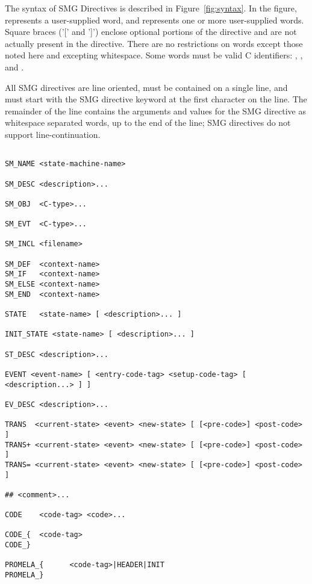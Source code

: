 The syntax of SMG Directives is described in Figure~\ref{fig:syntax}.
In the figure,  represents a user-supplied word, and
  represents one or more user-supplied words.  Square
braces ('[' and ']') enclose optional portions of the directive and
are not actually present in the directive.  There are no restrictions
on  words except those noted here and excepting whitespace.
Some  words must be valid C identifiers:
, , and
.

All SMG directives are line oriented, must be contained on a single
line, and must start with the SMG directive keyword at the first
character on the line.  The remainder of the line contains the
arguments and values for the SMG directive as whitespace separated
words, up to the end of the line; SMG directives do not support
line-continuation.

\begin{figure*}[p]
\begin{verbatim}

SM_NAME <state-machine-name>

SM_DESC <description>...

SM_OBJ  <C-type>...

SM_EVT  <C-type>...

SM_INCL <filename>

SM_DEF  <context-name>
SM_IF   <context-name>
SM_ELSE <context-name>
SM_END  <context-name>

STATE   <state-name> [ <description>... ]

INIT_STATE <state-name> [ <description>... ]

ST_DESC <description>...

EVENT <event-name> [ <entry-code-tag> <setup-code-tag> [ <description...> ] ]

EV_DESC <description>...

TRANS  <current-state> <event> <new-state> [ [<pre-code>] <post-code> ]
TRANS+ <current-state> <event> <new-state> [ [<pre-code>] <post-code> ]
TRANS= <current-state> <event> <new-state> [ [<pre-code>] <post-code> ]

## <comment>...

CODE    <code-tag> <code>...

CODE_{  <code-tag>
CODE_}

PROMELA_{      <code-tag>|HEADER|INIT
PROMELA_}

\end{verbatim}
\caption{SMG Directive Syntax}
\label{fig:syntax}
\end{figure*}


